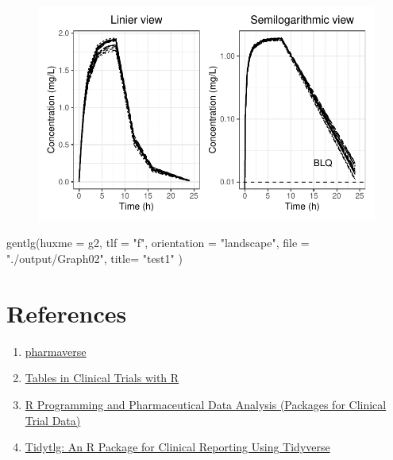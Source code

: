 \documentclass[
  letterpaper,
  DIV=11,
  numbers=noendperiod]{scrreprt}
\newenvironment{Shaded}{\begin{snugshade}}{\end{snugshade}}
\newcommand{\AttributeTok}[1]{\textcolor[rgb]{0.40,0.45,0.13}{#1}}
\newcommand{\FunctionTok}[1]{\textcolor[rgb]{0.28,0.35,0.67}{#1}}
\newcommand{\NormalTok}[1]{\textcolor[rgb]{0.00,0.23,0.31}{#1}}
\newcommand{\StringTok}[1]{\textcolor[rgb]{0.13,0.47,0.30}{#1}}
\providecommand{\tightlist}{%
  \setlength{\itemsep}{0pt}\setlength{\parskip}{0pt}}\usepackage{longtable,booktabs,array}
\begin{document}
\begin{figure}[H]

{\centering \includegraphics{output_flow2_files/figure-pdf/nca3-2.pdf}

}

\end{figure}

\begin{Shaded}
\begin{Highlighting}[]
\FunctionTok{gentlg}\NormalTok{(}\AttributeTok{huxme =}\NormalTok{ g2,}
       \AttributeTok{tlf =} \StringTok{"f"}\NormalTok{,}
       \AttributeTok{orientation =} \StringTok{"landscape"}\NormalTok{,}
       \AttributeTok{file =} \StringTok{"./output/Graph02"}\NormalTok{,}
       \AttributeTok{title=} \StringTok{"test1"}
\NormalTok{)}
\end{Highlighting}
\end{Shaded}


\hypertarget{references}{%
\chapter*{References}\label{references}}


\begin{enumerate}
\def\labelenumi{\arabic{enumi}.}
\tightlist
\item
  \href{https://pharmaverse.org/}{pharmaverse}
\item
  \href{https://rconsortium.github.io/rtrs-wg/}{Tables in Clinical
  Trials with R}
\item
  \href{https://appsilon.com/pharmaceutical-and-clinical-trial-data-analysis-packages/}{R
  Programming and Pharmaceutical Data Analysis (Packages for Clinical
  Trial Data)}
\item
  \href{https://phuse.s3.eu-central-1.amazonaws.com/Archive/2023/Connect/US/Florida/PAP_OS02.pdf}{Tidytlg:
  An R Package for Clinical Reporting Using Tidyverse}
\end{enumerate}
\end{document}
